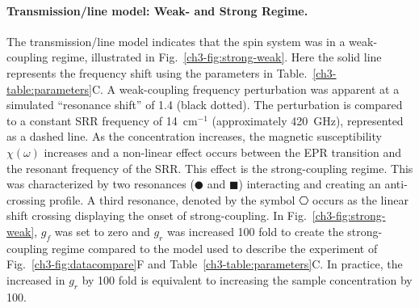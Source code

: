 \noindent \paragraph*{Transmission\-/line model: Weak- and Strong Regime.} The transmission\-/line model indicates that the spin system was in a weak-coupling regime, illustrated in Fig.~\ref{ch3-fig:strong-weak}. Here the solid line represents the frequency shift using the parameters in Table.~\ref{ch3-table:parameters}C. A weak-coupling frequency perturbation was apparent at a simulated ``resonance shift'' of 1.4 (black dotted). The perturbation is compared to a constant SRR frequency of 14~cm$^{-1}$ (approximately 420~GHz), represented as a dashed line. As the concentration increases, the magnetic susceptibility $\chi(\omega)$ increases and a non-linear effect occurs between the EPR transition and the resonant frequency of the SRR. This effect is the strong-coupling regime. This was characterized by two resonances ($\CIRCLE$ and $\blacksquare$) interacting and creating an anti-crossing profile. A third resonance, denoted by the symbol $\hexagon$ occurs as the linear shift crossing displaying the onset of strong-coupling. In Fig.~\ref{ch3-fig:strong-weak}, $g_f$ was set to zero and $g_r$ was increased 100 fold to create the strong-coupling regime compared to the model used to describe the experiment of Fig.~\ref{ch3-fig:datacompare}F and Table~\ref{ch3-table:parameters}C. In practice, the increased in $g_r$ by 100 fold is equivalent to increasing the sample concentration by 100.

